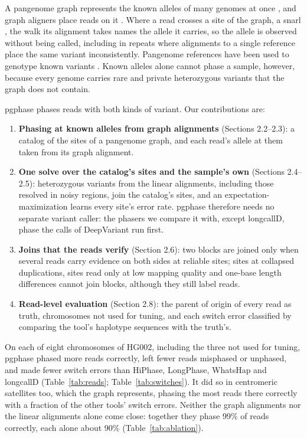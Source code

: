 A pangenome graph represents the known alleles of many genomes at once \citep{Liao2023,Hickey2024}, and graph aligners place reads on it \citep{Garrison2018,Siren2021,Chang2025}. Where a read crosses a site of the graph, a snarl \citep{Paten2018}, the walk its alignment takes names the allele it carries, so the allele is observed without being called, including in repeats where alignments to a single reference place the same variant inconsistently. Pangenome references have been used to genotype known variants \citep{Siren2021,Ebler2022}. Known alleles alone cannot phase a sample, however, because every genome carries rare and private heterozygous variants that the graph does not contain.

pgphase phases reads with both kinds of variant. Our contributions are:

\begin{enumerate}
  \item \textbf{Phasing at known alleles from graph alignments} (Sections 2.2--2.3): a catalog of the sites of a pangenome graph, and each read's allele at them taken from its graph alignment.
  \item \textbf{One solve over the catalog's sites and the sample's own} (Sections 2.4--2.5): heterozygous variants from the linear alignments, including those resolved in noisy regions, join the catalog's sites, and an expectation-maximization learns every site's error rate. pgphase therefore needs no separate variant caller: the phasers we compare it with, except longcallD, phase the calls of DeepVariant run first.
  \item \textbf{Joins that the reads verify} (Section 2.6): two blocks are joined only when several reads carry evidence on both sides at reliable sites; sites at collapsed duplications, sites read only at low mapping quality and one-base length differences cannot join blocks, although they still label reads.
  \item \textbf{Read-level evaluation} (Section 2.8): the parent of origin of every read as truth, chromosomes not used for tuning, and each switch error classified by comparing the tool's haplotype sequences with the truth's.
\end{enumerate}

On each of eight chromosomes of HG002, including the three not used for tuning, pgphase phased more reads correctly, left fewer reads misphased or unphased, and made fewer switch errors than HiPhase, LongPhase, WhatsHap and longcallD (Table~\ref{tab:reads}; Table~\ref{tab:switches}). It did so in centromeric satellites too, which the graph represents, phasing the most reads there correctly with a fraction of the other tools' switch errors. Neither the graph alignments nor the linear alignments alone come close: together they phase 99\% of reads correctly, each alone about 90\% (Table~\ref{tab:ablation}).
